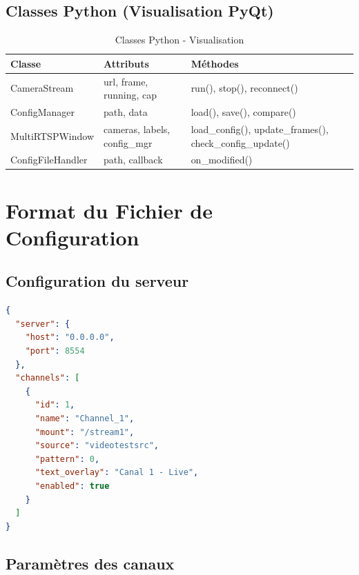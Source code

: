 \documentclass[12pt,a4paper]{report}
\begin{document}
\section{Classes Python (Visualisation PyQt)}

\begin{table}[H]
    \centering
    \caption{Classes Python - Visualisation}
    \label{tab:classes_python_viewer}
    \begin{tabular}{|l|l|l|}
        \hline
        \textbf{Classe} & \textbf{Attributs} & \textbf{Méthodes} \\
        \hline
        CameraStream & url, frame, running, cap & run(), stop(), reconnect() \\
        ConfigManager & path, data & load(), save(), compare() \\
        MultiRTSPWindow & cameras, labels, config\_mgr & load\_config(), update\_frames(), check\_config\_update() \\
        ConfigFileHandler & path, callback & on\_modified() \\
        \hline
    \end{tabular}
\end{table}

\chapter{Format du Fichier de Configuration}

\section{Configuration du serveur}

\begin{lstlisting}[language=json, caption=rtsp\_config.json]
{
  "server": {
    "host": "0.0.0.0",
    "port": 8554
  },
  "channels": [
    {
      "id": 1,
      "name": "Channel_1",
      "mount": "/stream1",
      "source": "videotestsrc",
      "pattern": 0,
      "text_overlay": "Canal 1 - Live",
      "enabled": true
    }
  ]
}
\end{lstlisting}

\section{Paramètres des canaux}
\end{document}
